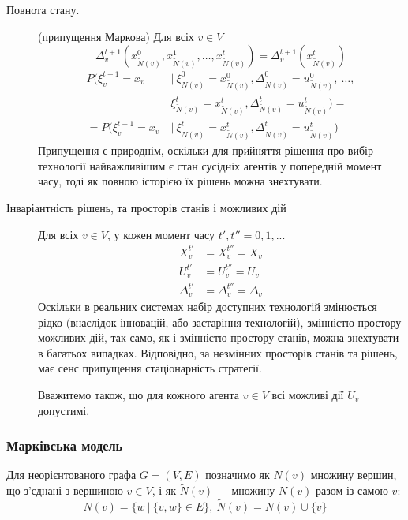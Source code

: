 \documentclass[oneside,14pt]{extarticle}
\begin{document}
\begin{description}
	\item[Повнота стану.] (припущення Маркова) Для всіх \(v \in V\)
	\[\Delta_v^{t+1}(x_{\tilde{N}(v)}^0, x_{\tilde{N}(v)}^1, \ldots, x_{\tilde{N}(v)}^t) = \Delta_v^{t+1}(x_{\tilde{N}(v)}^t)\]
	\begin{align*}
	P(\xi_v^{t+1} = x_v\ &|\ \xi_{\tilde N(v)}^0 = x_{\tilde N(v)}^0, \Delta_{\tilde N(v)}^0 = u_{\tilde N(v)}^0,\ \ldots,\\ &\xi_{\tilde N(v)}^t = x_{\tilde N(v)}^t, \Delta_{\tilde N(v)}^t = u_{\tilde N(v)}^t) = \\
	= P(\xi_v^{t+1} = x_v\ & |\ \xi_{\tilde N(v)}^t = x_{\tilde N(v)}^t, \Delta_{\tilde N(v)}^t = u_{\tilde N(v)}^t)
	\end{align*}
	Припущення є природнім, оскільки для прийняття рішення про вибір технології найважливішим є стан сусідніх агентів у попередній момент часу, тоді як повною історією їх рішень можна знехтувати.
	
    \item[Інваріантність рішень, та просторів станів і можливих дій] Для всіх \(v \in V\), у кожен момент часу \(t', t'' = 0, 1, ...\ \)
    \begin{align*}
      X_v^{t'} &= X_v^{t''} = X_v \\
      U_v^{t'} &= U_v^{t''} = U_v \\
	  \Delta_v^{t'} &= \Delta_v^{t''} = \Delta_v
    \end{align*}
	Оскільки в реальних системах набір доступних технологій змінюється рідко (внаслідок інновацій, або застаріння технологій), змінністю простору можливих дій, так само, як і змінністю простору станів, можна знехтувати в багатьох випадках. Відповідно, за незмінних просторів станів та рішень, має сенс припущення стаціонарність стратегії.
	
	Вважитемо також, що для кожного агента \(v \in V\) всі можливі дії \(U_v\) допустимі.

\end{description}







\subsubsection{Марківська модель}

Для неорієнтованого графа \(G = (V, E)\) позначимо як \(N(v)\) множину вершин, що з’єднані з вершиною \(v \in V\), і як \(\tilde{N}(v)\) — множину \(N(v)\) разом із самою \(v\):
\[N(v) = \{w\ |\ \{v, w\} \in E\},\ \tilde{N}(v) = N(v) \cup \{v\}\]
\end{document}
